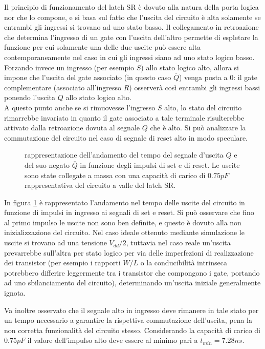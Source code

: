 	Il principio di funzionamento del latch SR è dovuto alla natura della porta logica nor che lo compone, e si basa sul fatto che l'uscita del circuito è alta solamente se entrambi gli ingressi si trovano ad uno stato basso. Il collegamento in retroazione che determina l'ingresso di un gate con l'uscita dell'altro permette di espletare la funzione per cui solamente una delle due uscite può essere alta contemporaneamente nel caso in cui gli ingressi siano ad uno stato logico basso. Forzando invece un ingresso (per esempio $S$) allo stato logico alto, allora si impone che l'uscita del gate associato (in questo caso $\overline Q$) venga posta a 0: il gate complementare (associato all'ingresso $R$) osserverà così entrambi gli ingressi bassi ponendo l'uscita $Q$ allo stato logico alto.\\
	A questo punto anche se si rimuovesse l'ingresso $S$ alto, lo stato del circuito rimarrebbe invariato in quanto il gate associato a tale terminale risulterebbe attivato dalla retroazione dovuta al segnale $Q$ che è alto. Si può analizzare la commutazione del circuito nel caso di segnale di reset alto in modo speculare.
	
	\begin{figure}[H]
		\centering
		
		\caption{rappresentazione dell'andamento del tempo del segnale d'uscita $Q$ e del suo negato $\overline Q$ in funzione degli impulsi di set e di reset. Le uscite sono state collegate a massa con una capacità di carico di $0.75pF$ rappresentativa del circuito a valle del latch SR.}
		\label{fig:srl:transitorio}
	\end{figure}

	In figura \ref{fig:srl:transitorio} è rappresentato l'andamento nel tempo delle uscite del circuito in funzione di impulsi in ingresso ai segnali di set e reset. Si può osservare che fino al primo impulso le uscite non sono ben definite, e questo è dovuto alla non inizializzazione del circuito. Nel caso ideale ottenuto mediante simulazione le uscite si trovano ad una tensione $V_{dd}/2$, tuttavia nel caso reale un'uscita prevarrebbe sull'altra per stato logico per via delle imperfezioni di realizzazione dei transistor (per esempio i rapporti $W/L$ o la conducibilità intrinseca potrebbero differire leggermente tra i transistor che compongono i gate, portando ad uno sbilanciamento del circuito), determinando un'uscita iniziale generalmente ignota.
	
	Va inoltre osservato che il segnale alto in ingresso deve rimanere in tale stato per un tempo necessario a garantire la rispettiva commutazione dell'uscita, pena la non corretta funzionalità del circuito stesso. Considerando la capacità di carico di $0.75pF$ il valore dell'impulso alto deve essere al minimo pari a $t_{min} = 7.28ns$. 

